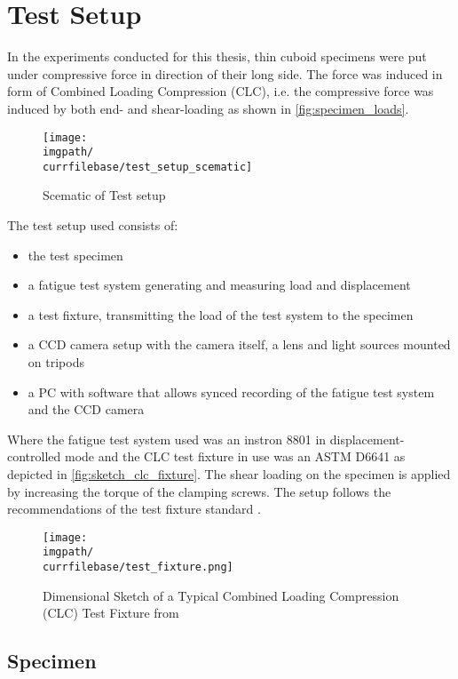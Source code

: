 \chapter{Test Setup}
\label{chap:\currfilebase}

In the experiments conducted for this thesis, thin cuboid specimens were put under compressive force in direction of their long side. The force was induced in form of Combined Loading Compression (CLC), i.e. the compressive force was induced by both end- and shear-loading as shown in \autoref{fig:specimen_loads}.

\begin{figure}[!ht]
    \centering
    \texttt{[image: \\imgpath/\\currfilebase/test\_setup\_scematic]}
    \caption{Scematic of Test setup}
    \label{fig:test_setup_scematic}
\end{figure}

The test setup used consists of:
\begin{itemize}
    \item the test specimen
    \item a fatigue test system generating and measuring load and displacement
    \item a test fixture, transmitting the load of the test system to the specimen
    \item a CCD camera setup with the camera itself, a lens and light sources mounted on tripods
    \item a PC with software that allows synced recording of the fatigue test system and the CCD camera
\end{itemize}

Where the fatigue test system used was an instron 8801 in displacement-controlled mode and the CLC test fixture in use was an ASTM D6641 as depicted in \autoref{fig:sketch_clc_fixture}. The shear loading on the specimen is applied by increasing the torque of the clamping screws. The setup follows the recommendations of the test fixture standard \cite{D6641standard}.

\begin{figure}[!ht]
    \centering
    \texttt{[image: \\imgpath/\\currfilebase/test\_fixture.png]}
    \caption{Dimensional Sketch of a Typical Combined Loading Compression (CLC) Test Fixture from \cite{D6641standard}}
    \label{fig:sketch_clc_fixture}
\end{figure}

\section{Specimen}
\label{sec:specimen}

